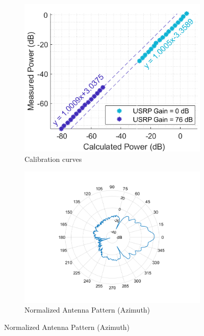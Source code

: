 \documentclass[10pt, twocolumn]{IEEEtran}
\begin{document}
\begin{figure} [t]
     \begin{subfigure}{0.333\linewidth}
         \centering
         \includegraphics[width=1.0\linewidth]{figs/Calibration_Curves.png}
         \caption{Calibration curves}
         \label{F3a}
     \end{subfigure}
     \begin{subfigure}{0.333\linewidth}
         \centering
         \includegraphics[width=1.0\linewidth]{figs/Antenna_Pattern_Normalized_2D_Azimuth.png}
         \caption{Normalized Antenna Pattern (Azimuth)}
         \label{F3b}
     \end{subfigure}

\end{figure}
\end{document}
